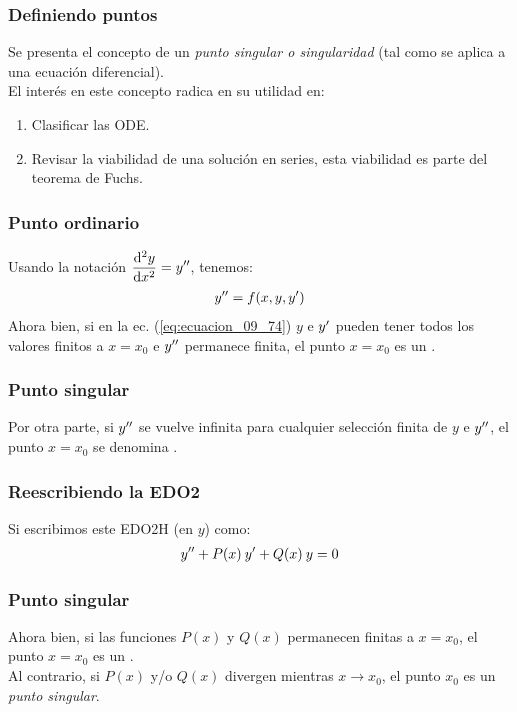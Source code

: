 \documentclass[12pt]{beamer}
\begin{document}
\begin{frame}
\frametitle{Definiendo puntos}
Se presenta el concepto de un \emph{punto singular o singularidad} (tal como se aplica a una ecuación diferencial).
\\
\bigskip
\pause
El interés en este concepto radica en su utilidad en:
\pause
{}
\begin{enumerate}[<+->]
\item Clasificar las ODE.
\item Revisar la viabilidad de una solución en series, esta viabilidad es parte del teorema de Fuchs.
\end{enumerate}
\end{frame}
\begin{frame}
\frametitle{Punto ordinario}
Usando la notación $\displaystyle \dv[2]{y}{x} = {y}^{\prime \prime}$, tenemos:
\pause
\begin{align}
{y}^{\prime \prime} = f(x, y, {y}^{\prime})
\label{eq:ecuacion_09_74}
\end{align}
\pause
Ahora bien, si en la ec. (\ref{eq:ecuacion_09_74}) $y$ e ${y}^{\prime}$ pueden tener todos los valores finitos a $x = x_{0}$ e ${y}^{\prime \prime}$ permanece finita, el punto $x = x_{0}$ es un .
\end{frame}
\begin{frame}
\frametitle{Punto singular}
Por otra parte, si ${y}^{\prime \prime}$ se vuelve infinita para cualquier selección finita de $y$ e ${y}^{\prime \prime}$, el punto $x = x_{0}$ se denomina .
\end{frame}
\begin{frame}
\frametitle{Reescribiendo la EDO2}
Si escribimos este EDO2H (en $y$) como:
\pause
\begin{align}
{y}^{\prime \prime} + P (x) \: {y}^{\prime} + Q (x) \: y = 0
\label{eq:ecuacion_09_75}
\end{align}
\end{frame}
\begin{frame}
\frametitle{Punto singular}
Ahora bien, si las funciones $P (x)$ y $Q (x)$ permanecen finitas a $x = x_{0}$, el punto $x = x_{0}$ es un .
\\
\bigskip
\pause
Al contrario, si $P (x)$ y/o $Q (x)$ divergen mientras $x \to x_{0}$, el punto $x_{0}$ es un \emph{punto singular}.
\end{frame}
\end{document}
